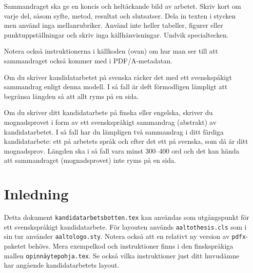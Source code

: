 \documentclass[swedish, 12pt, a4paper, elec, utf8, a-2b, online]{aaltothesis}
\date{21.9.2023}
\begin{document}
	
\makecoverpage

\makecopyrightpage


\begin{abstractpage}[swedish]
Sammandraget ska ge en koncis och heltäckande bild av arbetet. Skriv kort
om varje del, såsom syfte, metod, resultat och slutsatser. Dela in texten i
stycken men använd inga mellanrubriker. Använd inte heller tabeller,
figurer eller punktuppställningar och skriv inga källhänvisningar. Undvik
specialtecken. 

Notera också instruktionerna i källkoden (ovan) om hur man ser till att
sammandraget också kommer med i PDF/A-metadatan.

Om du skriver kandidatarbetet på svenska räcker det med ett svenskspåkigt
sammandrag enligt denna modell. I så fall är deft förmodligen lämpligt att
begränsa längden så att allt ryms på en sida.

Om du skriver ditt kandidatarbete på finska eller engelska, skriver du
mognadsprovet i form av ett svenskspråkigt sammandrag (abstrakt) av
kandidatarbetet. I så fall har du lämpligen två sammandrag i ditt färdiga
kandidatarbete: ett på arbetets språk och efter det ett på svenska, som då
är ditt mognadsprov. Längden ska i så fall vara minst 300--400 ord och det
kan hända att sammandraget (mognadsprovet) inte ryms på en sida.

\end{abstractpage}




\clearpage
\thesistableofcontents


\clearpage
\section{Inledning}

Detta dokument \texttt{kandidatarbetsbotten.tex} kan användas som
utgångspunkt för ett svenskspråkigt kandidatarbete. För layouten används
\texttt{aaltothesis.cls} som i sin tur använder
\texttt{aaltologo.sty}. Notera också att en relativt ny version av
\texttt{pdfx}-paketet behövs. Mera exempelkod och instruktioner finns i den
finskspråkiga mallen \texttt{opinnäytepohja.tex}. Se också vilka
instruktioner just ditt huvudämne har angående kandidatarbetets layout.
\end{document}
